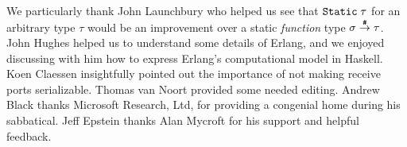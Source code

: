 \documentclass[preprint]{sigplanconf}
\begin{document}
\acks
We particularly thank John Launchbury who helped us see that $\text{\tt Static}\;\tau$ for an arbitrary type $\tau$
would be an improvement over a static \emph{function} type 
$\sigma \stackrel{\texttt{\#}}{\rightarrow} \tau$.  John Hughes helped us to understand some details of Erlang, and we enjoyed discussing with him how to express Erlang's computational model in Haskell. Koen Claessen
insightfully pointed out the importance of not making receive ports serializable. Thomas van Noort provided some needed editing.
Andrew Black thanks Microsoft Research, Ltd, for providing a congenial home during his sabbatical.
Jeff Epstein thanks Alan Mycroft for his support and helpful feedback. 





%
%
%
\end{document}

